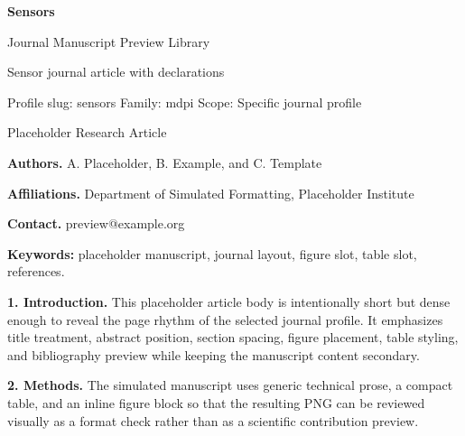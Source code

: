 \documentclass[10pt,a4paper]{article}
\begin{document}
\begin{center}
{\LARGE\bfseries Sensors}\par
\vspace{0.25em}
{\small Journal Manuscript Preview Library}\par
\vspace{0.15em}
{\footnotesize Sensor journal article with declarations}\par
\vspace{0.2em}
{\footnotesize Profile slug: sensors \quad Family: mdpi \quad Scope: Specific journal profile}
\end{center}
\vspace{0.2em}
 Placeholder Research Article\par\vspace{0.4em}


\noindent\textbf{Authors.} A. Placeholder, B. Example, and C. Template\par
\noindent\textbf{Affiliations.} Department of Simulated Formatting, Placeholder Institute\par
\noindent\textbf{Contact.} preview@example.org\par
\vspace{0.4em}
\par\vspace{0.6em}
\noindent\textbf{Keywords:} placeholder manuscript, journal layout, figure slot, table slot, references.\par\vspace{0.6em}


\small
\textbf{1. Introduction.} This placeholder article body is intentionally short but dense enough to reveal the page rhythm of the selected journal profile. It emphasizes title treatment, abstract position, section spacing, figure placement, table styling, and bibliography preview while keeping the manuscript content secondary.

\textbf{2. Methods.} The simulated manuscript uses generic technical prose, a compact table, and an inline figure block so that the resulting PNG can be reviewed visually as a format check rather than as a scientific contribution preview.
\end{document}
